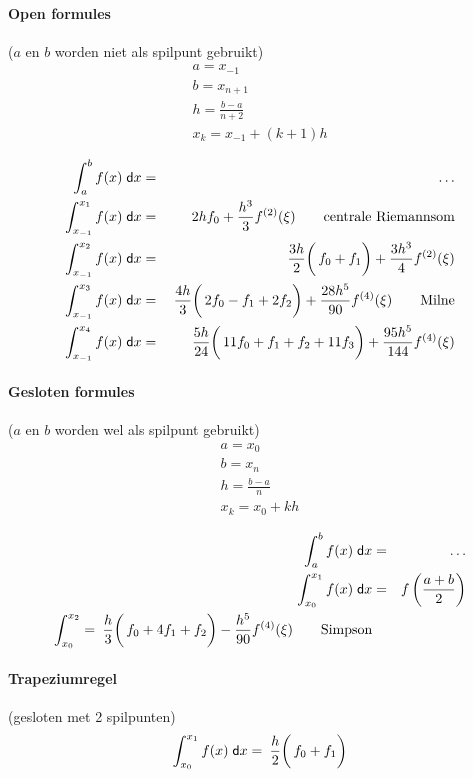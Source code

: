 \paragraph{Open formules} ($a$ en $b$ worden niet als spilpunt gebruikt)
\[
  \begin{array}{l}
    a = x_{-1}\\
    b = x_{n+1}\\
    h = \frac{b-a}{n+2}\\
    x_k= x_{-1} + (k+1)h\\
  \end{array}
\]
\begin{eqnarray*}
  \int_a^b f(x)\;\textsf{d}x & = & \ldots\\
  \int_{x_{-1}}^{x_1} f(x)\;\textsf{d}x & = & 2hf_0 + \frac{h^3}{3}f^{(2)}(\xi) \qquad \mbox{centrale Riemannsom}\\
  \int_{x_{-1}}^{x_2} f(x)\;\textsf{d}x & = & \left.\left. \frac{3h}{2}\right(f_0 + f_1\right) + \frac{3h^3}{4} f^{(2)}(\xi)\\
  \int_{x_{-1}}^{x_3} f(x)\;\textsf{d}x & = & \left.\left. \frac{4h}{3}\right(2f_0 -f_1 +2f_2\right) + \frac{28h^5}{90} f^{(4)}(\xi) \qquad \mbox{Milne}\\
  \int_{x_{-1}}^{x_4} f(x)\;\textsf{d}x & = & \left.\left. \frac{5h}{24}\right(11f_0 +f_1 +f_2 + 11f_3\right) + \frac{95h^5}{144} f^{(4)}(\xi)
\end{eqnarray*}


\paragraph{Gesloten formules} ($a$ en $b$ worden wel als spilpunt gebruikt)
\[
  \begin{array}{l}
    a = x_0\\
    b = x_n\\
    h = \frac{b-a}{n}\\
    x_k= x_0 +kh\\
  \end{array}
\]
\begin{eqnarray*}
  \int_a^b f(x)\;\textsf{d}x & = & \ldots\\
  \int_{x_0}^{x_ 1} f(x)\;\textsf{d}x & = & f\left( \frac{a+b}{2} \right)\\
  \int_{x_0}^{x_2} = \left. \left. \frac{h}{3} \right( f_0 + 4f_1 + f_2 \right) - \frac{h^5}{90}f^{(4)}(\xi) \qquad \mbox{Simpson}\\
\end{eqnarray*}


\paragraph{Trapeziumregel} (gesloten met 2 spilpunten)
\[
  \int_{x_0}^{x_1} f(x)\;\textsf{d}x = \left. \left. \frac{h}{2} \right(f_0 + f_1\right)
\]


